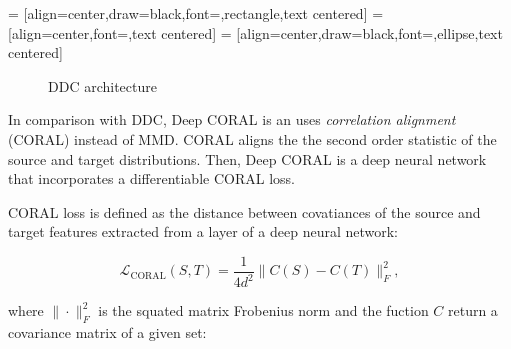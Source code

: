  = [align=center,draw=black,font=\tiny,rectangle,text centered]
 = [align=center,font=\tiny,text centered]
 = [align=center,draw=black,font=\tiny,ellipse,text centered]
\begin{figure}
\begin{center}
\end{center}
\caption{DDC architecture}
\end{figure}

In comparison with DDC, Deep CORAL is an uses \textit{correlation alignment} (CORAL)
instead of MMD.
CORAL aligns the the second order statistic of the source and target distributions.
Then, Deep CORAL is a deep neural network
that incorporates a differentiable CORAL loss.

CORAL loss is defined as the distance between covatiances of the source and target features extracted from a layer of a deep neural network:

\begin{equation}
	\mathcal{L}_{\mathrm{CORAL}}(S, T) = \frac{1}{4 d^2} \|C(S) - C(T)\|_F^2,
	\label{coral_loss}
\end{equation}

where \(\|\cdot\|_F^2\) is the squated matrix Frobenius norm
and the fuction \(C\) return a covariance matrix of a given set:

